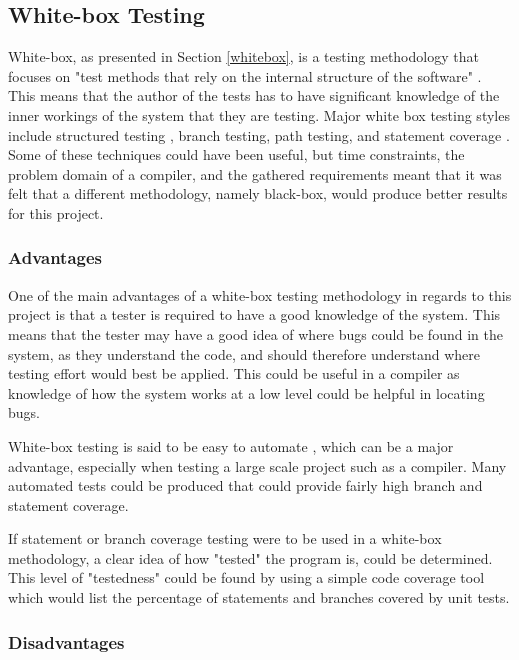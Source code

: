 \subsection{White-box Testing}

White-box, as presented in Section \ref{whitebox}, is a testing methodology that focuses on "test methods that rely on the internal structure of the software" \cite{ostrand}. This means that the author of the tests has to have significant knowledge of the inner workings of the system that they are testing. Major white box testing styles include structured testing \cite{watson}, branch testing, path testing, and statement coverage \cite{ammann} \cite{khan2012}. Some of these techniques could have been useful, but time constraints, the problem domain of a compiler, and the gathered requirements meant that it was felt that a different methodology, namely black-box, would produce better results for this project. 

\subsubsection{Advantages}

One of the main advantages of a white-box testing methodology in regards to this project is that a tester is required to have a good knowledge of the system. This means that the tester may have a good idea of where bugs could be found in the system, as they understand the code, and should therefore understand where testing effort would best be applied. This could be useful in a compiler as knowledge of how the system works at a low level could be helpful in locating bugs.

White-box testing is said to be easy to automate \cite{ammann}, which can be a major advantage, especially when testing a large scale project such as a compiler. Many automated tests could be produced that could provide fairly high branch and statement coverage. 

If statement or branch coverage testing were to be used in a white-box methodology, a clear idea of how "tested" the program is, could be determined. This level of "testedness" could be found by using a simple code coverage tool which would list the percentage of statements and branches covered by unit tests. 

\subsubsection{Disadvantages}

